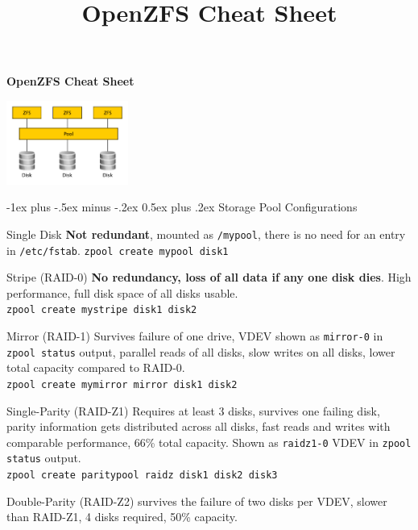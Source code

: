 \documentclass[10pt,landscape,letter]{article}
\title{OpenZFS Cheat Sheet}
\makeatletter
\renewcommand{\section}{\@startsection{section}{1}{0mm}%
                                {-1ex plus -.5ex minus -.2ex}%
                                {0.5ex plus .2ex}%
                                {\normalfont\large\bfseries}}
\makeatother
\begin{document}
\raggedright
\footnotesize

\begin{center}
	\Large{\textbf{OpenZFS Cheat Sheet}}
\end{center}
\begin{multicols}{3}
	\setlength{\premulticols}{1pt}
	\setlength{\postmulticols}{1pt}
	\setlength{\multicolsep}{1pt}
	\setlength{\columnsep}{2pt}


  \includegraphics[width=0.3\textwidth]{archzfs}

	\section{Storage Pool Configurations}
  \begin{Description}%
    \item[Single Disk] \textbf{Not redundant}, mounted as
      \texttt{/mypool}, there is no need for an entry in \texttt{/etc/fstab}.
      \texttt{zpool create mypool disk1}
    \item[Stripe (RAID-0)] \textbf{No redundancy, loss of all data if any one
      disk dies}. High performance, full disk space of all disks usable.\\
      \texttt{zpool create mystripe disk1	disk2}
    \item[Mirror (RAID-1)] Survives failure of one drive, VDEV shown as
      \texttt{mirror-0} in \texttt{zpool status} output, parallel reads of all
      disks, slow writes on all disks, lower total capacity compared to
      RAID-0.\\ \texttt{zpool create mymirror mirror disk1 disk2}
    \item[Single-Parity (RAID-Z1)] Requires at least 3 disks, survives one failing
      disk, parity information gets distributed across all disks, fast reads and
      writes with comparable performance, 66\% total capacity. Shown as
      \texttt{raidz1-0} VDEV in \texttt{zpool status} output.\\ \texttt{zpool create
      paritypool raidz disk1 disk2 disk3}
    \item[Double-Parity (RAID-Z2)] survives the failure of two disks per VDEV,
      slower than RAID-Z1, 4 disks required, 50\% capacity.

\end{Description}
\end{multicols}
\end{document}
